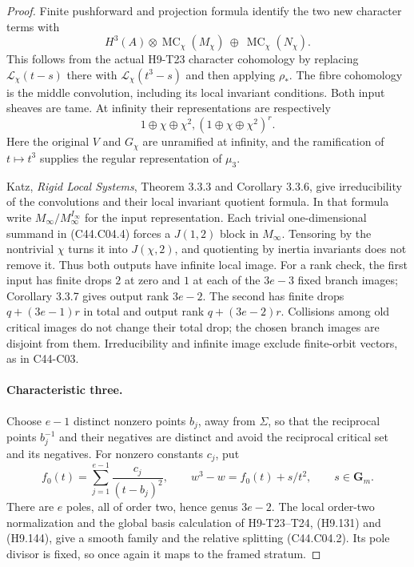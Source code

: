 \documentclass[11pt]{article}
\theoremstyle{remark}\newtheorem{remark}[theorem]{Remark}
\begin{document}
\begin{proof}
Finite pushforward and projection formula identify the two new
character terms with
\[
          H^3(A)\otimes\operatorname{MC}_\chi(M_\chi)
                    \ \oplus\ 
                    \operatorname{MC}_\chi(N_\chi).
 \tag{C44.C04.3}
\]
This follows from the actual H9-T23 character cohomology by replacing
$\mathcal L_\chi(t-s)$ there with
$\mathcal L_\chi(t^3-s)$ and then applying $\rho_*$. The fibre
cohomology is the middle convolution, including its local invariant
conditions. Both input sheaves are tame. At infinity their
representations are respectively
\[
                 1\oplus\chi\oplus\chi^2,
                (1\oplus\chi\oplus\chi^2)^{r}.
 \tag{C44.C04.4}
\]
Here the original $V$ and $G_\chi$ are unramified at infinity,
and the ramification of $t\mapsto t^3$ supplies the regular
representation of $\mu_3$.

Katz, \emph{Rigid Local Systems}, Theorem 3.3.3 and Corollary 3.3.6,
give irreducibility of the convolutions and their local invariant
quotient formula. In that formula write
$M_\infty/M_\infty^{I_\infty}$ for the input representation.
Each trivial one-dimensional summand in (C44.C04.4) forces a
$J(1,2)$ block in $M_\infty$. Tensoring by the nontrivial $\chi$
turns it into $J(\chi,2)$, and quotienting by inertia invariants
does not remove it. Thus both outputs have infinite local image.
For a rank check, the first input has finite drops $2$ at zero
and $1$ at each of the $3e-3$ fixed branch images; Corollary
3.3.7 gives output rank $3e-2$. The second has finite drops
$q+(3e-1)r$ in total and output rank $q+(3e-2)r$.
Collisions among old critical images do not change their total
drop; the chosen branch images are disjoint from them.
Irreducibility and infinite image exclude finite-orbit vectors,
as in C44-C03.

\paragraph{Characteristic three.}
Choose $e-1$ distinct nonzero points $b_j$, away from $\Sigma$, so
that the reciprocal points $b_j^{-1}$ and their negatives are
distinct and avoid the reciprocal critical set and its negatives.
For nonzero constants $c_j$, put
\[
 f_0(t)=\sum_{j=1}^{e-1}\frac{c_j}{(t-b_j)^2},
 \qquad w^3-w=f_0(t)+s/t^2,\qquad s\in\mathbf G_m.
 \tag{C44.C04.5}
\]
There are $e$ poles, all of order two, hence genus $3e-2$.
The local order-two normalization and the global basis calculation
of H9-T23--T24, (H9.131) and (H9.144), give a smooth family and
the relative splitting (C44.C04.2). Its pole divisor is fixed,
so once again it maps to the framed stratum.


\end{proof}
\end{document}
